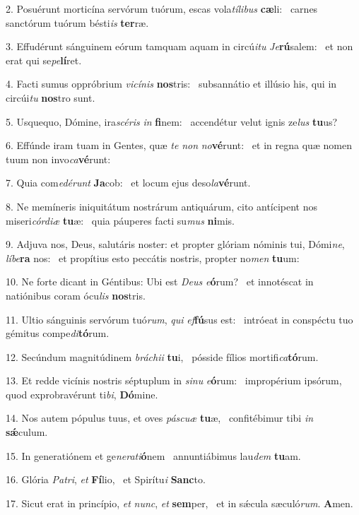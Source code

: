 2. Posuérunt morticína servórum tuórum, escas vola\textit{tí}\textit{li}\textit{bus} \textbf{cæ}li: \ast\  carnes sanctórum tuórum bésti\textit{is} \textbf{ter}ræ.\

3. Effudérunt sánguinem eórum tamquam aquam in circú\textit{i}\textit{tu} \textit{Je}\textbf{rú}salem: \ast\  et non erat qui se\textit{pe}\textbf{lí}ret.\

4. Facti sumus oppróbrium \textit{vi}\textit{cí}\textit{nis} \textbf{nos}tris: \ast\  subsannátio et illúsio his, qui in circúi\textit{tu} \textbf{nos}tro sunt.\

5. Usquequo, Dómine, ira\textit{scé}\textit{ris} \textit{in} \textbf{fi}nem: \ast\  accendétur velut ignis ze\textit{lus} \textbf{tu}us?\

6. Effúnde iram tuam in Gentes, quæ \textit{te} \textit{non} \textit{no}\textbf{vé}runt: \ast\  et in regna quæ nomen tuum non invo\textit{ca}\textbf{vé}runt:\

7. Quia com\textit{e}\textit{dé}\textit{runt} \textbf{Ja}cob: \ast\  et locum ejus deso\textit{la}\textbf{vé}runt.\

8. Ne memíneris iniquitátum nostrárum antiquárum, cito antícipent nos miseri\textit{cór}\textit{di}\textit{æ} \textbf{tu}æ: \ast\  quia páuperes facti su\textit{mus} \textbf{ni}mis.\

9. Adjuva nos, Deus, salutáris noster: et propter glóriam nóminis tui, Dómi\textit{ne}, \textit{lí}\textit{be}\textbf{ra} nos: \ast\  et propítius esto peccátis nostris, propter no\textit{men} \textbf{tu}um:\

10. Ne forte dicant in Géntibus: Ubi est \textit{De}\textit{us} \textit{e}\textbf{ó}rum? \ast\  et innotéscat in natiónibus coram ócu\textit{lis} \textbf{nos}tris.\

11. Ultio sánguinis servórum tuó\textit{rum}, \textit{qui} \textit{ef}\textbf{fú}sus est: \ast\  intróeat in conspéctu tuo gémitus compe\textit{di}\textbf{tó}rum.\

12. Secúndum magnitúdinem \textit{brá}\textit{chi}\textit{i} \textbf{tu}i, \ast\  pósside fílios mortifi\textit{ca}\textbf{tó}rum.\

13. Et redde vicínis nostris séptuplum in \textit{si}\textit{nu} \textit{e}\textbf{ó}rum: \ast\  impropérium ipsórum, quod exprobravérunt ti\textit{bi}, \textbf{Dó}mine.\

14. Nos autem pópulus tuus, et oves \textit{pás}\textit{cu}\textit{æ} \textbf{tu}æ, \ast\  confitébimur tibi \textit{in} \textbf{sǽ}culum.\

15. In generatiónem et ge\textit{ne}\textit{ra}\textit{ti}\textbf{ó}nem \ast\  annuntiábimus lau\textit{dem} \textbf{tu}am.\

16. Glória \textit{Pa}\textit{tri}, \textit{et} \textbf{Fí}lio, \ast\  et Spirítu\textit{i} \textbf{Sanc}to.\

17. Sicut erat in princípio, \textit{et} \textit{nunc}, \textit{et} \textbf{sem}per, \ast\  et in sǽcula sæculó\textit{rum}. \textbf{A}men.\

